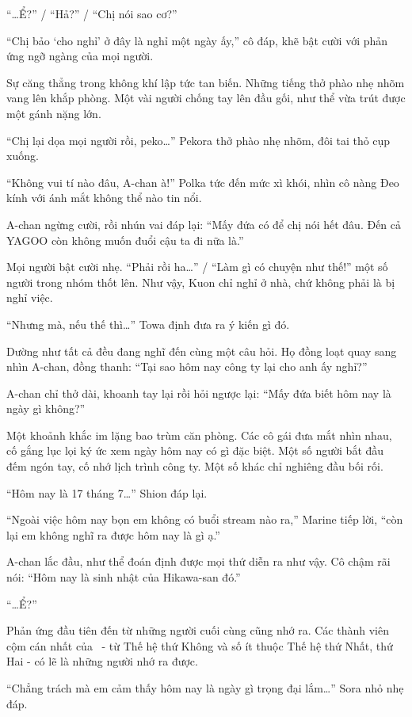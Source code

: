 \documentclass[../main.tex]{subfiles}
\begin{document}
``\dots Ể?'' / ``Hả?'' / ``Chị nói sao cơ?''

``Chị bảo `cho nghỉ' ở đây là nghỉ một ngày ấy,'' cô đáp, khẽ bật cười với phản ứng ngỡ ngàng của mọi người.

Sự căng thẳng trong không khí lập tức tan biến. Những tiếng thở phào nhẹ nhõm vang lên khắp phòng. Một vài người chống tay lên đầu gối, như thể vừa trút được một gánh nặng lớn.

``Chị lại dọa mọi người rồi, peko\dots'' Pekora thở phào nhẹ nhõm, đôi tai thỏ cụp xuống.

``Không vui tí nào đâu, A-chan à!'' Polka tức đến mức xì khói, nhìn cô nàng Đeo kính với ánh mắt không thể nào tin nổi.

A-chan ngừng cười, rồi nhún vai đáp lại: ``Mấy đứa có để chị nói hết đâu. Đến cả YAGOO còn không muốn đuổi cậu ta đi nữa là.''

Mọi người bật cười nhẹ. ``Phải rồi ha\dots'' / ``Làm gì có chuyện như thế!'' một số người trong nhóm thốt lên. Như vậy, Kuon chỉ nghỉ ở nhà, chứ không phải là bị nghỉ việc.

``Nhưng mà, nếu thế thì\dots'' Towa định đưa ra ý kiến gì đó.

Dường như tất cả đều đang nghĩ đến cùng một câu hỏi. Họ đồng loạt quay sang nhìn A-chan, đồng thanh: ``Tại sao hôm nay công ty lại cho anh ấy nghỉ?''

A-chan chỉ thở dài, khoanh tay lại rồi hỏi ngược lại: ``Mấy đứa biết hôm nay là ngày gì không?''

Một khoảnh khắc im lặng bao trùm căn phòng. Các cô gái đưa mắt nhìn nhau, cố gắng lục lọi ký ức xem ngày hôm nay có gì đặc biệt. Một số người bắt đầu đếm ngón tay, cố nhớ lịch trình công ty. Một số khác chỉ nghiêng đầu bối rối.

``Hôm nay là 17 tháng 7\dots'' Shion đáp lại.

``Ngoài việc hôm nay bọn em không có buổi stream nào ra,'' Marine tiếp lời, ``còn lại em không nghĩ ra được hôm nay là gì ạ.''

A-chan lắc đầu, như thể đoán định được mọi thứ diễn ra như vậy. Cô chậm rãi nói: ``Hôm nay là sinh nhật của Hikawa-san đó.''

``\dots Ể?''

Phản ứng đầu tiên đến từ những người cuối cùng cũng nhớ ra. Các thành viên cộm cán nhất của \hll\ - từ Thế hệ thứ Không và số ít thuộc Thế hệ thứ Nhất, thứ Hai - có lẽ là những người nhớ ra được.

``Chẳng trách mà em cảm thấy hôm nay là ngày gì trọng đại lắm\dots'' Sora nhỏ nhẹ đáp.
\end{document}
